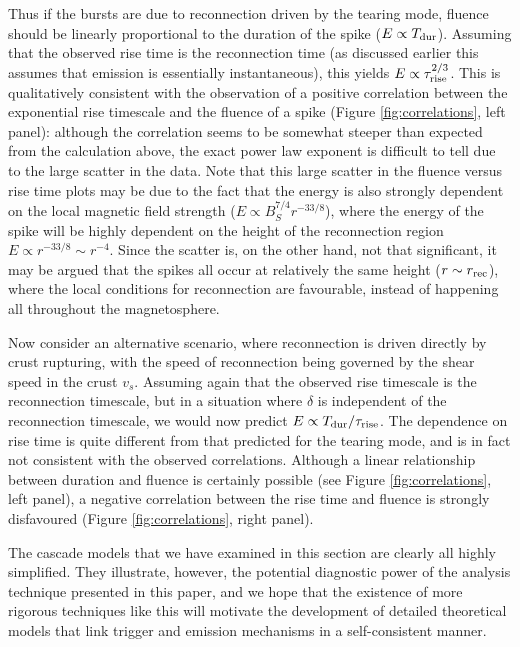 \documentclass[12pt]{emulateapj}
\begin{document}
Thus if the bursts are due to reconnection driven by the tearing mode, fluence should be linearly proportional to the duration of the spike ($E\propto T_{\rm dur}$).  Assuming that the observed rise time is the reconnection time (as discussed earlier this assumes that emission is essentially instantaneous), this yields $E\propto\tau_{\rm rise}^{2/3}$.  This is qualitatively consistent with the observation of a positive correlation between the exponential rise timescale and the fluence of a spike (Figure \ref{fig:correlations}, left panel): although the correlation seems to be somewhat steeper than expected from the calculation above, the exact power law exponent is difficult to tell due to the large scatter in the data.   Note that this large scatter in the fluence versus rise time plots may be due to the fact that the energy is also strongly dependent on the local magnetic field strength ($E\propto B_S^{7/4}r^{-33/8}$), where the energy of the spike will be highly dependent on the height of the reconnection region $E\propto r^{-33/8}\sim r^{-4}$. Since the scatter is, on the other hand, not that significant, it may be argued that the spikes all occur at relatively the same height ($r\sim r_{\rm rec}$), where the local conditions for reconnection are favourable, instead of happening all throughout the magnetosphere.

Now consider an alternative scenario, where reconnection is driven directly by crust rupturing, with the speed of reconnection being governed by the shear speed in the crust $v_s$.  Assuming again that the observed rise timescale is the reconnection timescale, but in a situation where $\delta$ is independent of the reconnection timescale, we would now predict $E \propto T_\mathrm{dur}/\tau_{\rm rise}$.  The dependence on rise time is quite different from that predicted for the tearing mode, and is in fact not consistent with the observed correlations.  Although a linear relationship between duration and fluence is certainly possible (see Figure \ref{fig:correlations}, left panel), a negative correlation between the rise time and fluence is strongly disfavoured (Figure \ref{fig:correlations}, right panel).

The cascade models that we have examined in this section are clearly all highly simplified.  They illustrate, however, the potential diagnostic power of the analysis technique presented in this paper, and we hope that the existence of more rigorous techniques like this will motivate the development of detailed theoretical models that link trigger and emission mechanisms in a self-consistent manner.  
\end{document}
